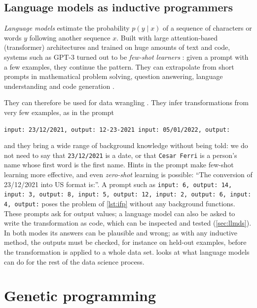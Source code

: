 \subsection{Language models as inductive programmers}

\emph{Language models} estimate the probability $p(y\mid x)$ of a sequence of characters or words $y$
following another sequence $x$. Built with large attention-based (transformer) architectures
\citep{vaswani2017attention} and trained on huge amounts of text and code, systems such as GPT-3 turned
out to be \emph{few-shot learners} \citep{brown2020language}: given a prompt with a few examples, they
continue the pattern. They can extrapolate from short prompts in mathematical
problem solving, question answering, language understanding and code generation
\citep{chen2021evaluating}.

They can therefore be used for data wrangling \citep{jaimovitch2023can}. They infer transformations
from very few examples, as in the prompt
\begin{center}
\texttt{input: 23/12/2021, output: 12-23-2021 \quad input: 05/01/2022, output:}
\end{center}
and they bring a wide range of background knowledge without being told: we do not need to say that
\texttt{23/12/2021} is a date, or that \texttt{Cesar Ferri} is a person's name whose first word is the
first name. Hints in the prompt make few-shot learning more effective, and even \emph{zero-shot}
learning is possible: ``The conversion of 23/12/2021 into US format is:''. A prompt such as
\texttt{input: 6, output: 14, input: 3, output: 8, input: 5, output: 12, input: 2, output: 6, input: 4,
output:} poses the problem of \cref{lst:ifp} without any background functions. These prompts ask for
output values; a language model can also be asked to write the
transformation as code, which can be inspected and tested (\cref{sec:llmds}). In both modes its answers
can be plausible and wrong;
as with any inductive method, the outputs must be checked, for instance on held-out examples, before
the transformation is applied to a whole data set.  looks at what language models can
do for the rest of the data science process.

\section{Genetic programming\extsec}\label{sec:gp}

